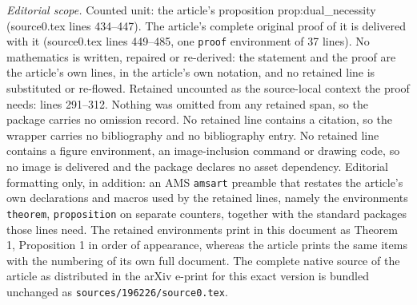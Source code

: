 \documentclass[10pt,a4paper]{amsart}
\begin{document}
\noindent\textit{Editorial scope.} Counted unit: the article's proposition prop:dual\_necessity (source0.tex lines 434--447). The article's complete original proof of it is delivered with it (source0.tex lines 449--485, one \texttt{proof} environment of 37 lines). No mathematics is written, repaired or re-derived: the statement and the proof are the article's own lines, in the article's own notation, and no retained line is substituted or re-flowed.  Retained uncounted as the source-local context the proof needs: lines 291--312.  Nothing was omitted from any retained span, so the package carries no omission record.  No retained line contains a citation, so the wrapper carries no bibliography and no bibliography entry.  No retained line contains a figure environment, an image-inclusion command or drawing code, so no image is delivered and the package declares no asset dependency.  Editorial formatting only, in addition: an AMS \texttt{amsart} preamble that restates the article's own declarations and macros used by the retained lines, namely the environments \texttt{theorem}, \texttt{proposition} on separate counters, together with the standard packages those lines need.  The retained environments print in this document as Theorem 1, Proposition 1 in order of appearance, whereas the article prints the same items with the numbering of its own full document.  The complete native source of the article as distributed in the arXiv e-print for this exact version is bundled unchanged as \texttt{sources/196226/source0.tex}.
\end{document}
